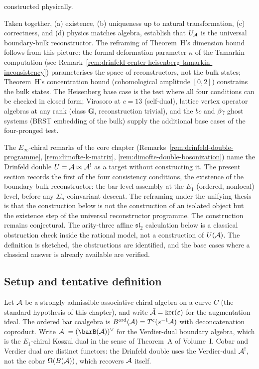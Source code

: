 \begin{remark}
\begin{enumerate}[label=\textup{(\alph*)},leftmargin=2em]
constructed physically.
\end{enumerate}
Taken together, (a) existence, (b) uniqueness up to natural
transformation, (c) correctness, and (d) physics matches
algebra, establish that $U_{\mathcal{A}}$ is the universal
boundary-bulk reconstructor. The reframing of
Theorem~H's dimension bound follows from this picture: the
formal deformation parameter $\kappa$ of the Tamarkin
computation (see Remark~\ref{rem:drinfeld-center-heisenberg-tamarkin-inconsistency})
parameterises the space of reconstructors, not the bulk
states; Theorem~H's concentration bound (cohomological amplitude $[0,2]$) constrains the bulk
states. The Heisenberg base case is the test where all four
conditions can be checked in closed form; Virasoro at $c=13$
(self-dual), lattice vertex operator algebras at any rank
(class $\mathbf{G}$, reconstruction trivial), and the $bc$
and $\beta\gamma$ ghost systems (BRST embedding of the bulk)
supply the additional base cases of the four-pronged test.
\end{remark}

The $E_\infty$-chiral remarks of the core chapter
(Remarks~\ref{rem:drinfeld-double-programme},
\ref{rem:dimofte-k-matrix},
\ref{rem:dimofte-double-bosonization})
name the Drinfeld double $U = \mathcal{A} \bowtie \mathcal{A}^!$ as a target
without constructing it. The present section records the
first of the four consistency conditions, the existence of
the boundary-bulk reconstructor: the bar-level assembly at
the $E_1$ (ordered, nonlocal) level, before any
$\Sigma_n$-coinvariant descent. The reframing under the
unifying thesis is that the construction below is not the
construction of an isolated object but the existence step of
the universal reconstructor programme. The construction remains
conjectural. The arity-three affine $\mathfrak{sl}_2$
calculation below is a classical obstruction check inside the
rational model, not a construction of $U(\mathcal{A})$. The definition is
sketched, the obstructions are identified, and the base cases where
a classical answer is already available are verified.

\subsection{Setup and tentative definition}
\label{subsec:drinfeld-e1-definition}

Let $\mathcal{A}$ be a strongly admissible associative chiral algebra
on a curve $C$ (the standard hypothesis of this chapter), and
write $\bar{\mathcal{A}} = \ker(\varepsilon)$ for the augmentation ideal.
The ordered bar coalgebra is
$B^{\mathrm{ord}}(\mathcal{A}) = T^c(s^{-1}\bar{\mathcal{A}})$ with
deconcatenation coproduct. Write $\cA^! = (\barB(\cA))^\vee$
for the Verdier-dual boundary algebra, which is the
$E_1$-chiral Koszul dual in the sense of Theorem~A of
Volume~I. Cobar and Verdier dual are distinct functors:
the Drinfeld double uses the Verdier-dual $\mathcal{A}^!$, not the
cobar $\Omega(B(\mathcal{A}))$, which recovers $\mathcal{A}$ itself.

